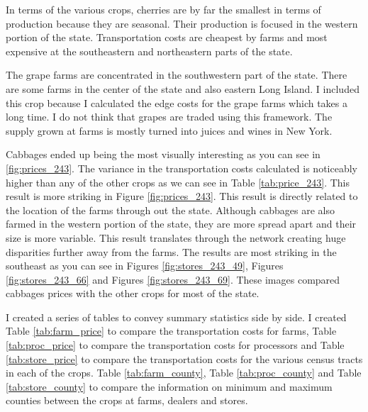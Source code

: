 \documentclass{report}
\begin{document}
In terms of the various crops, cherries are by far the smallest in terms of production because they are seasonal. Their production is focused in the western portion of the state. Transportation costs are cheapest by farms and most expensive at the southeastern and northeastern parts of the state.

The grape farms are concentrated in the southwestern part of the state. There are some farms in the center of the state and also eastern Long Island. I included this crop because I calculated the edge costs for the grape farms which takes a long time. I do not think that grapes are traded using this framework. The supply grown at farms is mostly turned into juices and wines in New York.

Cabbages ended up being the most visually interesting as you can see in \ref{fig:prices_243}. The variance in the transportation costs calculated is noticeably higher than any of the other crops as we can see in Table \ref{tab:price_243}. This result is more striking in Figure \ref{fig:prices_243}. This result is directly related to the location of the farms through out the state. Although cabbages are also farmed in the western portion of the state, they are more spread apart and their size is more variable. This result translates through the network creating huge disparities further away from the farms. The results are most striking in the southeast as you can see  in Figures \ref{fig:stores_243_49}, Figures \ref{fig:stores_243_66} and Figures \ref{fig:stores_243_69}. These images compared cabbages prices with the other crops for most of the state.

I created a series of tables to convey summary statistics side by side. I created Table \ref{tab:farm_price} to compare the transportation costs for farms, Table \ref{tab:proc_price} to compare the transportation costs for processors and Table \ref{tab:store_price} to compare the transportation costs for the various census tracts in each of the crops. Table \ref{tab:farm_county}, Table \ref{tab:proc_county} and Table \ref{tab:store_county} to compare the information on minimum and maximum counties between the crops at farms, dealers and stores.

\end{document}
